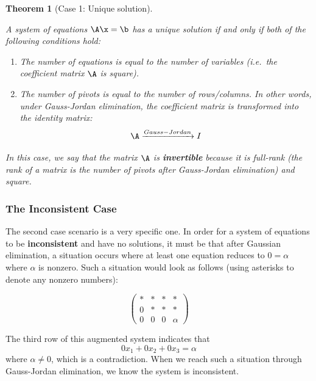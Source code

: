 \documentclass[
]{article}
\providecommand{\tightlist}{%
  \setlength{\itemsep}{0pt}\setlength{\parskip}{0pt}}
\newtheorem{theorem}{Theorem}[section]
\theoremstyle{definition}
\theoremstyle{definition}
\theoremstyle{definition}
\theoremstyle{definition}
\theoremstyle{remark}
\begin{document}
\begin{theorem}[Case 1: Unique solution]
\protect\hypertarget{thm:case1}{}\label{thm:case1}

A system of equations \(\A\x=\b\) has a unique solution if and only if \emph{both} of the following conditions hold:

\begin{enumerate}
\def\labelenumi{\arabic{enumi}.}
\tightlist
\item
  The number of equations is equal to the number of variables (i.e.~the coefficient matrix \(\A\) is \emph{square}).
\item
  The number of pivots is equal to the number of rows/columns. In other words, under Gauss-Jordan elimination, the coefficient matrix is transformed into the identity matrix:
  \[\A \xrightarrow{Gauss-Jordan} I\]
\end{enumerate}

In this case, we say that the matrix \(\A\) is \textbf{invertible} because it is full-rank (the rank of a matrix is the number of pivots after Gauss-Jordan elimination) \emph{and} square.

\end{theorem}

\hypertarget{inconsistent}{%
\subsubsection{The Inconsistent Case}\label{inconsistent}}

The second case scenario is a very specific one. In order for a system of equations to be \textbf{inconsistent} and have no solutions, it must be that after Gaussian elimination, a situation occurs where at least one equation reduces to \(0=\alpha\) where \(\alpha\) is nonzero. Such a situation would look as follows (using asterisks to denote any nonzero numbers):

\[\left(\begin{array}{rrr|r} *&*&*&*\\0&*&*&*\\0&0&0&\alpha\end{array}\right) \]

The third row of this augmented system indicates that \[0x_1+0x_2+0x_3=\alpha\] where \(\alpha\neq 0\), which is a contradiction. When we reach such a situation through Gauss-Jordan elimination, we know the system is inconsistent.
\end{document}
